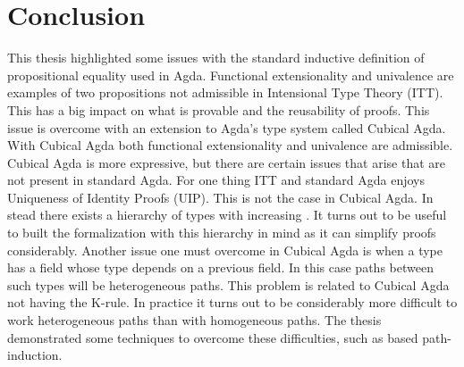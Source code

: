 \chapter{Conclusion}
This thesis highlighted some issues with the standard inductive
definition of propositional equality used in Agda. Functional
extensionality and univalence are examples of two propositions not
admissible in Intensional Type Theory (ITT). This has a big impact on
what is provable and the reusability of proofs. This issue is overcome
with an extension to Agda's type system called Cubical Agda. With
Cubical Agda both functional extensionality and univalence are
admissible. Cubical Agda is more expressive, but there are certain
issues that arise that are not present in standard Agda. For one thing
ITT and standard Agda enjoys Uniqueness of Identity Proofs (UIP). This
is not the case in Cubical Agda. In stead there exists a hierarchy of
types with increasing .
It turns out to be useful to built the formalization with this
hierarchy in mind as it can simplify proofs considerably. Another
issue one must overcome in Cubical Agda is when a type has a field
whose type depends on a previous field. In this case paths between
such types will be heterogeneous paths. This problem is related to
Cubical Agda not having the K-rule. In practice it turns out to be
considerably more difficult to work heterogeneous paths than with
homogeneous paths. The thesis demonstrated some techniques to overcome
these difficulties, such as based path-induction.

